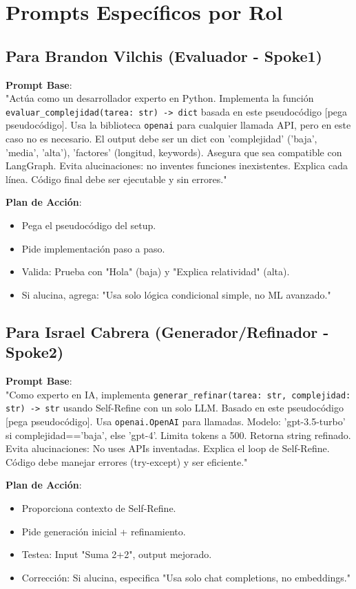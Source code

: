 \documentclass{article}
\begin{document}
\section{Prompts Específicos por Rol}

\subsection{Para Brandon Vilchis (Evaluador - Spoke1)}

\textbf{Prompt Base}: \\
"Actúa como un desarrollador experto en Python. Implementa la función \texttt{evaluar\_complejidad(tarea: str) -> dict} basada en este pseudocódigo [pega pseudocódigo]. Usa la biblioteca \texttt{openai} para cualquier llamada API, pero en este caso no es necesario. El output debe ser un dict con 'complejidad' ('baja', 'media', 'alta'), 'factores' (longitud, keywords). Asegura que sea compatible con LangGraph. Evita alucinaciones: no inventes funciones inexistentes. Explica cada línea. Código final debe ser ejecutable y sin errores."

\textbf{Plan de Acción}:
\begin{itemize}
    \item Pega el pseudocódigo del setup.
    \item Pide implementación paso a paso.
    \item Valida: Prueba con "Hola" (baja) y "Explica relatividad" (alta).
    \item Si alucina, agrega: "Usa solo lógica condicional simple, no ML avanzado."
\end{itemize}

\subsection{Para Israel Cabrera (Generador/Refinador - Spoke2)}

\textbf{Prompt Base}: \\
"Como experto en IA, implementa \texttt{generar\_refinar(tarea: str, complejidad: str) -> str} usando Self-Refine con un solo LLM. Basado en este pseudocódigo [pega pseudocódigo]. Usa \texttt{openai.OpenAI} para llamadas. Modelo: 'gpt-3.5-turbo' si complejidad=='baja', else 'gpt-4'. Limita tokens a 500. Retorna string refinado. Evita alucinaciones: No uses APIs inventadas. Explica el loop de Self-Refine. Código debe manejar errores (try-except) y ser eficiente."

\textbf{Plan de Acción}:
\begin{itemize}
    \item Proporciona contexto de Self-Refine.
    \item Pide generación inicial + refinamiento.
    \item Testea: Input "Suma 2+2", output mejorado.
    \item Corrección: Si alucina, especifica "Usa solo chat completions, no embeddings."
\end{itemize}
\end{document}
